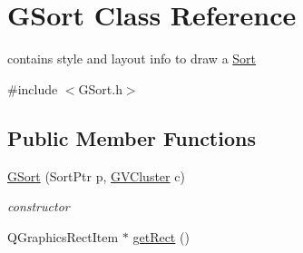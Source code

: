 \hypertarget{class_g_sort}{\section{\-G\-Sort \-Class \-Reference}
\label{class_g_sort}
}


contains style and layout info to draw a \hyperlink{class_sort}{\-Sort}  




{\ttfamily \#include $<$\-G\-Sort.\-h$>$}

\subsection*{\-Public \-Member \-Functions}
\begin{DoxyCompactItemize}
\item 
\hyperlink{class_g_sort_a423709cc4cc15bc05219b08e1276f455}{\-G\-Sort} (\-Sort\-Ptr p, \hyperlink{struct_g_v_cluster}{\-G\-V\-Cluster} c)
\begin{DoxyCompactList}\small\item\em constructor \end{DoxyCompactList}\item 
\hypertarget{class_g_sort_a62b1a8ada691f61cb100568bf25f78d6}{\-Q\-Graphics\-Rect\-Item $\ast$ \hyperlink{class_g_sort_a62b1a8ada691f61cb100568bf25f78d6}{get\-Rect} ()}\label{class_g_sort_a62b1a8ada691f61cb100568bf25f78d6}


\end{DoxyCompactItemize}
